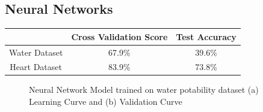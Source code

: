 \documentclass[
	letterpaper, %
]{mlreport}
\begin{document}
\subsection{Neural Networks}


\begin{center}
	\begin{tabular}{|c||c|c|}
	 \hline
	  & Cross Validation Score & Test Accuracy \\
	 \hline\hline
	 Water Dataset & 67.9\%  & 39.6\% \\
	 \hline
	 Heart Dataset & 83.9\%  & 73.8\% \\
	 \hline
	\end{tabular}
	\label{table:table3}
\end{center}
\begin{figure}
	\centering
	\caption{Neural Network Model trained on water potability dataset (a) Learning Curve and (b) Validation Curve}
	\label{fig:fig6}
\end{figure}
\end{document}
